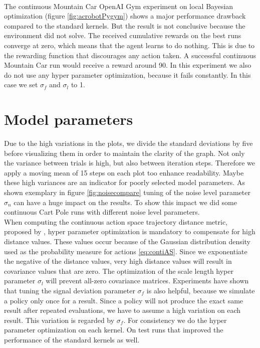 \\
The continuous Mountain Car OpenAI Gym experiment on local Bayesian optimization (figure \ref{fig:acrobotPygym}) shows a major performance drawback compared to the standard kernels. But the result is not conclusive because the environment did not solve. The received cumulative rewards on the best runs converge at zero, which means that the agent learns to do nothing. This is due to the rewarding function that discourages any action taken. A successful continuous Mountain Car run would receive a reward around 90. In this experiment we also do not use any hyper parameter optimization, because it fails constantly. In this case we set $\sigma_f$ and $\sigma_l$ to 1.

\section{Model parameters}

Due to the high variations in the plots, we divide the standard deviations by five before visualizing them in order to maintain the clarity of the graph. Not only the variance between trials is high, but also between iteration steps. Therefore we apply a moving mean of 15 steps on each plot too enhance readability. Maybe these high variances are an indicator for poorly selected model parameters. As shown exemplary in figure \ref{fig:noisecompare} tuning of the noise level parameter $\sigma_n$ can have a huge impact on the results. To show this impact we did some continuous Cart Pole runs with different noise level parameters.
\\
When computing the continuous action space trajectory distance metric, proposed by \cite{wilson2014using}, hyper parameter optimization is mandatory to compensate for high distance values. These values occur because of the Gaussian distribution density used as the probability measure for actions \ref{eq:contiAS}. Since we exponentiate the negative of the distance values, very high distance values will result in covariance values that are zero. The optimization of the scale length hyper parameter $\sigma_l$ will prevent all-zero covariance matrices. Experiments have shown that tuning the signal deviation parameter $\sigma_f$ is also helpful, because we simulate a policy only once for a result. Since a policy will not produce the exact same result after repeated evaluations, we have to assume a high variation on each result. This variation is regarded by $\sigma_f$. For consistency we do the hyper parameter optimization on each kernel. On test runs that improved the performance of the standard kernels as well.\\

